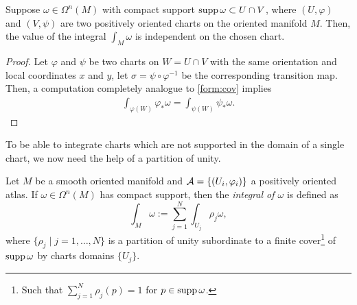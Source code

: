 \begin{lemma}\label{lemma:intindep:chart}
  Suppose $\omega\in\Omega^n(M)$ with compact support $\operatorname{supp} \omega \subset U\cap V$, where $(U, \varphi)$ and $(V, \psi)$ are two positively oriented charts on the oriented manifold $M$.
  Then, the value of the integral $\int_M\omega$ is independent on the chosen chart.
\end{lemma}
\begin{proof}
  Let $\varphi$ and $\psi$ be two charts on $W = U\cap V$ with the same orientation and local coordinates $x$ and $y$, let $\sigma = \psi\circ\varphi^{-1}$ be the corresponding transition map.
  Then, a computation completely analogue to \eqref{form:cov} implies
  \begin{align}
    \int_{\varphi(W)} \varphi_*\omega = \int_{\psi(W)} \psi_*\omega.
  \end{align}
\end{proof}

To be able to integrate charts which are not supported in the domain of a single chart, we now need the help of a partition of unity.

\begin{definition}
  Let $M$ be a smooth oriented manifold and $\mathcal{A} = \{(U_i,\varphi_i)\}$ a positively oriented atlas.
  If $\omega \in \Omega^n(M)$ has compact support, then the \emph{integral of $\omega$} is defined as
  \begin{equation}\label{eq:intnform}
    \int_M \omega := \sum_{j=1}^N \int_{U_j}\rho_j\omega,
  \end{equation}
  where $\{\rho_j\mid j=1,\ldots, N\}$ is a partition of unity subordinate to a finite cover\footnote{Such that $\sum_{j=1}^N \rho_j(p) = 1$ for $p\in\operatorname{supp}\omega$.} of $\operatorname{supp} \omega$ by charts domains $\{U_j\}$.
\end{definition}

